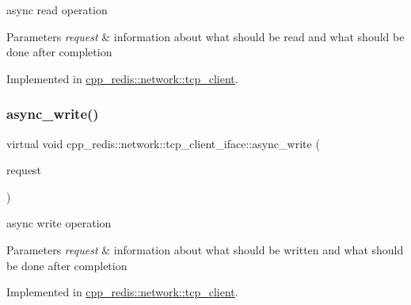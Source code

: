 async read operation


\begin{DoxyParams}{Parameters}
{\em request} & information about what should be read and what should be done after completion \\
\hline
\end{DoxyParams}


Implemented in \mbox{\hyperlink{classcpp__redis_1_1network_1_1tcp__client_a5eed4225fcd01e3108580d863c94c2cc}{cpp\+\_\+redis\+::network\+::tcp\+\_\+client}}.

\mbox{\label{classcpp__redis_1_1network_1_1tcp__client__iface_a9cd01e8a68479456d15d6435ffad9b92}} 
\subsubsection{\texorpdfstring{async\+\_\+write()}{async\_write()}}
{\footnotesize\ttfamily virtual void cpp\+\_\+redis\+::network\+::tcp\+\_\+client\+\_\+iface\+::async\+\_\+write (\begin{DoxyParamCaption}\item[{\mbox{\hyperlink{structcpp__redis_1_1network_1_1tcp__client__iface_1_1write__request}{write\+\_\+request}} \&}]{request }\end{DoxyParamCaption})\hspace{0.3cm}{\ttfamily [pure virtual]}}

async write operation


\begin{DoxyParams}{Parameters}
{\em request} & information about what should be written and what should be done after completion \\
\hline
\end{DoxyParams}


Implemented in \mbox{\hyperlink{classcpp__redis_1_1network_1_1tcp__client_a6d15785b71776cd85426c9634cb446f0}{cpp\+\_\+redis\+::network\+::tcp\+\_\+client}}.

\mbox{\label{classcpp__redis_1_1network_1_1tcp__client__iface_a81ee982136e85b7c3401393341bc594c}} 
